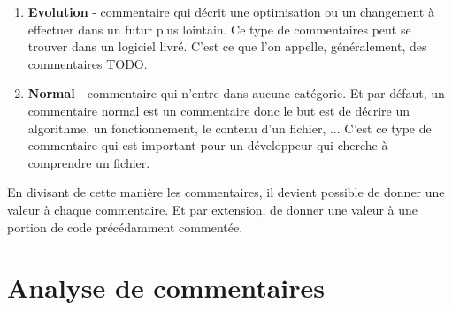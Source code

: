 \documentclass[10pt,a4paper,twoside, openany]{report}
\begin{document}
\begin{enumerate}
\item{\textbf{Evolution} - commentaire qui d\'ecrit une optimisation ou un changement \`a effectuer dans un futur plus lointain. Ce type de commentaires peut se trouver dans un logiciel livr\'e. C'est ce que l'on appelle, g\'en\'eralement, des commentaires TODO.\newline}
\item{\textbf{Normal} - commentaire qui n'entre dans aucune cat\'egorie. Et par d\'efaut, un commentaire normal est un commentaire donc le but est de d\'ecrire un algorithme, un fonctionnement, le contenu d'un fichier, ... C'est ce type de commentaire qui est important pour un d\'eveloppeur qui cherche \`a comprendre un fichier.\newline}
\end{enumerate}

En divisant de cette mani\`ere les commentaires, il devient possible de donner une valeur \`a chaque commentaire. Et par extension, de donner une valeur \`a une portion de code pr\'ec\'edamment comment\'ee.

\section{Analyse de commentaires}
\end{document}
